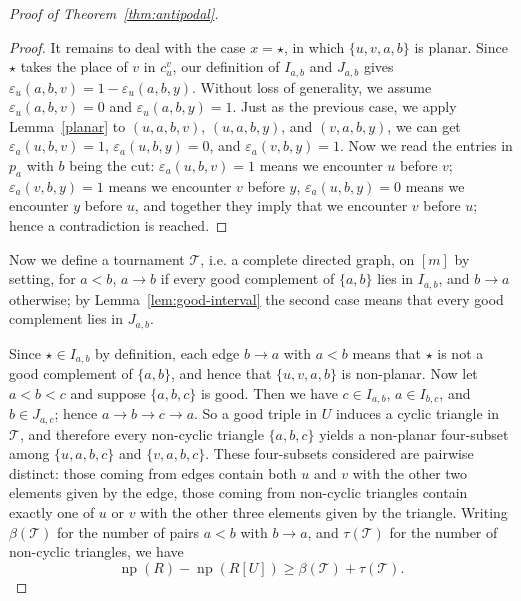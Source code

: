 \documentclass[10pt,a4paper]{amsart}
\newcommand{\np}{\operatorname{np}}
\begin{document}
\begin{proof}[Proof of Theorem~\ref{thm:antipodal}]
\begin{proof}
It remains to deal with the case \(x=\star\), in which
\(\{u,v,a,b\}\) is planar.  Since \(\star\) takes the place of \(v\) in
\(c_u^v\), our definition of \(I_{a,b}\) and \(J_{a,b}\) gives
\(\varepsilon_u(a,b,v)=1-\varepsilon_u(a,b,y)\). Without loss of generality, we assume \(\varepsilon_u(a,b,v)=0\) and \(\varepsilon_u(a,b,y)=1\). Just as the previous case, we apply Lemma~\ref{planar} to \((u,a,b,v)\), \((u,a,b,y)\), and \((v,a,b,y)\), we can get \(\varepsilon_a(u,b,v)=1\), \(\varepsilon_a(u,b,y)=0\), and \(\varepsilon_a(v,b,y)=1\). Now we read the entries in \(p_a\) with \(b\) being the cut: \(\varepsilon_a(u,b,v)=1\) means we encounter \(u\) before \(v\);
\(\varepsilon_a(v,b,y)=1\) means we encounter \(v\) before \(y\), \(\varepsilon_a(u,b,y)=0\) means we encounter \(y\) before \(u\), and together they imply that we encounter \(v\) before \(u\); hence a contradiction is reached.
\end{proof}

Now we define a tournament \(\mathcal T\), i.e. a complete directed graph, on \([m]\) by setting, for
\(a<b\), \(a\to b\) if every good complement of \(\{a,b\}\) lies in
\(I_{a,b}\), and \(b\to a\) otherwise; by
Lemma~\ref{lem:good-interval} the second case means that every good
complement lies in \(J_{a,b}\).

Since \(\star \in I_{a,b}\) by definition, each edge
\(b\to a\) with \(a<b\) means that \(\star\) is not a good complement
of \(\{a,b\}\), and hence that \(\{u,v,a,b\}\) is non-planar. Now let \(a<b<c\) and suppose \(\{a,b,c\}\) is good.  Then we have
\(c\in I_{a,b}\), \(a\in I_{b,c}\), and \(b\in J_{a,c}\);
hence \(a\to b\to c\to a\).  So a good triple in \(U\) induces a
cyclic triangle in \(\mathcal{T}\), and therefore every non-cyclic triangle
\(\{a,b,c\}\) yields a non-planar four-subset among
\(\{u,a,b,c\}\) and \(\{v,a,b,c\}\). These four-subsets considered are pairwise
distinct: those coming from edges contain both \(u\) and \(v\) with the other two elements given by the edge, those
coming from non-cyclic triangles contain exactly one of \(u\) or \(v\) with the other three elements given by the triangle. Writing \(\beta(\mathcal T)\) for the number
of pairs \(a<b\) with \(b\to a\), and \(\tau(\mathcal T)\) for the
number of non-cyclic triangles, we have
\begin{equation}\label{eq:new-np-tournament}
\np(R)-\np(R[U])\geq \beta(\mathcal T)+\tau(\mathcal T).
\end{equation}


\end{proof}
\end{document}
